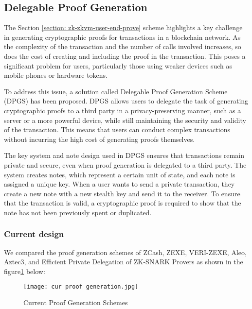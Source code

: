 \subsection{Delegable Proof Generation}\label{section: zk-zkvm-delegable-prove}

The Section \ref{section: zk-zkvm-user-end-prove} scheme highlights a key challenge in generating cryptographic proofs for transactions in a blockchain network. As the complexity of the transaction and the number of calls involved increases, so does the cost of creating and including the proof in the transaction. This poses a significant problem for users, particularly those using weaker devices such as mobile phones or hardware tokens.

To address this issue, a solution called Delegable Proof Generation Scheme (DPGS) has been proposed. DPGS allows users to delegate the task of generating cryptographic proofs to a third party in a privacy-preserving manner, such as a server or a more powerful device, while still maintaining the security and validity of the transaction. This means that users can conduct complex transactions without incurring the high cost of generating proofs themselves.

The key system and note design used in DPGS ensures that transactions remain private and secure, even when proof generation is delegated to a third party. The system creates notes, which represent a certain unit of state, and each note is assigned a unique key. When a user wants to send a private transaction, they create a new note with a new stealth key and send it to the receiver. To ensure that the transaction is valid, a cryptographic proof is required to show that the note has not been previously spent or duplicated.

\subsubsection{Current design}

We compared the proof generation schemes of ZCash\cite{website:zcash-nu5}, ZEXE\cite{cryptoeprint:2018/962}, VERI-ZEXE\cite{cryptoeprint:2022/802}, Aleo\cite{website:aleo-vm}, Aztec3\cite{website:Aztec3}, and Efficient Private Delegation of ZK-SNARK Provers\cite{website:epdzp} as shown in the figure\ref{fig:cur_proof_generation} below:
\begin{figure}[!ht]
    \centering
    \texttt{[image: cur proof generation.jpg]}
    \caption{Current Proof Generation Schemes}
    \label{fig:cur_proof_generation}
\end{figure}

